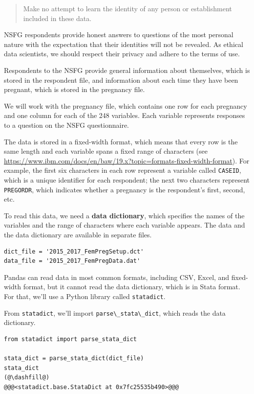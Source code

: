 \begin{quote}
Make no attempt to learn the identity of any person or establishment
included in these data.
\end{quote}

NSFG respondents provide honest answers to questions of the most
personal nature with the expectation that their identities will not be
revealed. As ethical data scientists, we should respect their privacy
and adhere to the terms of use.

Respondents to the NSFG provide general information about themselves,
which is stored in the respondent file, and information about each time
they have been pregnant, which is stored in the pregnancy file.

We will work with the pregnancy file, which contains one row for each
pregnancy and one column for each of the 248 variables. Each variable
represents responses to a question on the NSFG questionnaire.

The data is stored in a fixed-width format, which means that every row
is the same length and each variable spans a fixed range of characters
(see
\url{https://www.ibm.com/docs/en/baw/19.x?topic=formats-fixed-width-format}).
For example, the first six characters in each row represent a variable
called \passthrough{\lstinline!CASEID!}, which is a unique identifier
for each respondent; the next two characters represent
\passthrough{\lstinline!PREGORDR!}, which indicates whether a pregnancy
is the respondent's first, second, etc.

To read this data, we need a \textbf{data dictionary}, which specifies
the names of the variables and the range of characters where each
variable appears. The data and the data dictionary are available in
separate files.

\begin{lstlisting}[]
dict_file = '2015_2017_FemPregSetup.dct'
data_file = '2015_2017_FemPregData.dat'
\end{lstlisting}

Pandas can read data in most common formats, including CSV, Excel, and
fixed-width format, but it cannot read the data dictionary, which is in
Stata format. For that, we'll use a Python library called
\passthrough{\lstinline!statadict!}.

From \passthrough{\lstinline!statadict!}, we'll import
\passthrough{\lstinline!parse\_stata\_dict!}, which reads the data
dictionary.

\begin{lstlisting}[]
from statadict import parse_stata_dict

stata_dict = parse_stata_dict(dict_file)
stata_dict
(@\dashfill@)
@@@<statadict.base.StataDict at 0x7fc25535b490>@@@
\end{lstlisting}

